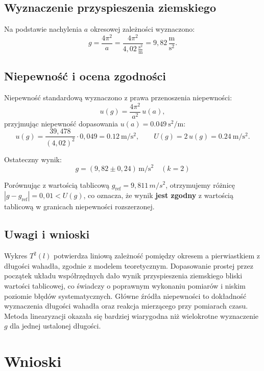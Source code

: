 \documentclass{fizykalab}
\begin{document}
\pagebreak

\subsection{Wyznaczenie przyspieszenia ziemskiego}

Na podstawie nachylenia \(a\) okresowej zależności wyznaczono:
\[
  g = \frac{4\pi^2}{a}
  = \frac{4\pi^2}{4{,}02\,\frac{\text{s}^2}{\text{m}}}
  = 9{,}82\,\frac{\text{m}}{\text{s}^2}.
\]

\subsection{Niepewność i ocena zgodności}

Niepewność standardową wyznaczono z prawa przenoszenia
niepewności:
\[
  u(g) = \frac{4\pi^2}{a^2}\,u(a),
\]
przyjmując niepewność dopasowania
\(u(a) = \SI{0.049}{\second\squared\per\meter}\):
\[
  u(g) = \frac{39{,}478}{(4{,}02)^2} \cdot 0{,}049
  = \SI{0,12}{\meter\per\second\squared},
  \qquad
  U(g) = 2\,u(g) = \SI{0,24}{\meter\per\second\squared}.
\]

Ostateczny wynik:
\[
  \boxed{
    g = (9{,}82 \pm 0{,}24)\,
    \si{\meter\per\second\squared}\quad(k=2)
  }
\]

Porównując z wartością tablicową
\( g_\text{ref} = 9{,}811\,\si{m/s^2} \),
otrzymujemy różnicę
\(|g - g_\text{ref}| = 0{,}01 < U(g)\),
co oznacza, że wynik \textbf{jest zgodny} z wartością tablicową
w granicach niepewności rozszerzonej.

\subsection{Uwagi i wnioski}

Wykres \(T^2(l)\) potwierdza liniową zależność pomiędzy okresem
a pierwiastkiem z długości wahadła, zgodnie z modelem teoretycznym.
Dopasowanie prostej przez początek układu współrzędnych dało wynik
przyspieszenia ziemskiego bliski wartości tablicowej,
co świadczy o poprawnym wykonaniu pomiarów i niskim poziomie
błędów systematycznych.
Główne źródła niepewności to dokładność wyznaczenia długości
wahadła oraz reakcja mierzącego przy pomiarach czasu.
Metoda linearyzacji okazała się bardziej wiarygodna niż
wielokrotne wyznaczenie \(g\) dla jednej ustalonej długości.

\pagebreak
\section{Wnioski}
\end{document}
